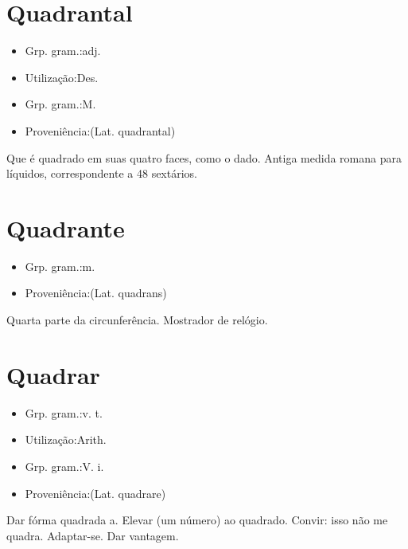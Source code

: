 \section{Quadrantal}
\begin{itemize}
\item {Grp. gram.:adj.}
\end{itemize}
\begin{itemize}
\item {Utilização:Des.}
\end{itemize}
\begin{itemize}
\item {Grp. gram.:M.}
\end{itemize}
\begin{itemize}
\item {Proveniência:(Lat. \textunderscore quadrantal\textunderscore )}
\end{itemize}
Que é quadrado em suas quatro faces, como o dado.
Antiga medida romana para líquidos, correspondente a 48 sextários.
\section{Quadrante}
\begin{itemize}
\item {Grp. gram.:m.}
\end{itemize}
\begin{itemize}
\item {Proveniência:(Lat. \textunderscore quadrans\textunderscore )}
\end{itemize}
Quarta parte da circunferência.
Mostrador de relógio.
\section{Quadrar}
\begin{itemize}
\item {Grp. gram.:v. t.}
\end{itemize}
\begin{itemize}
\item {Utilização:Arith.}
\end{itemize}
\begin{itemize}
\item {Grp. gram.:V. i.}
\end{itemize}
\begin{itemize}
\item {Proveniência:(Lat. \textunderscore quadrare\textunderscore )}
\end{itemize}
Dar fórma quadrada a.
Elevar (um número) ao quadrado.
Convir: \textunderscore isso não me quadra\textunderscore .
Adaptar-se.
Dar vantagem.
